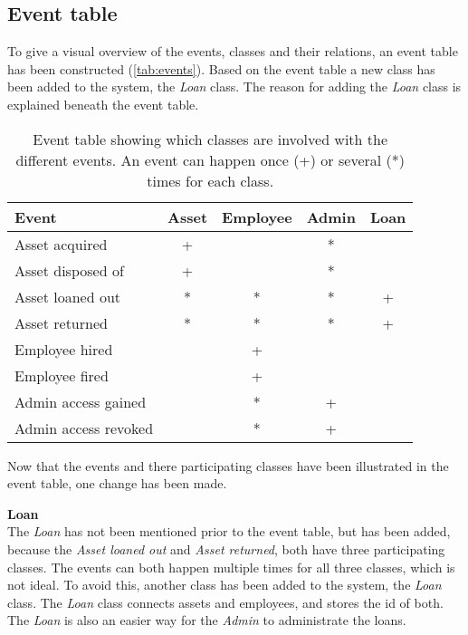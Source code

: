 \subsection{Event table}\label{ssc:eventtable}
To give a visual overview of the events, classes and their relations, an event table has been constructed (\autoref{tab:events}).
Based on the event table a new class has been added to the system, the \textit{Loan} class. The reason for adding the \textit{Loan} class is explained beneath the event table.

\begin{table}[H]
\centering
    \begin{tabular}{|l||c|c|c||c|}
        \hline
        \textbf{Event} & \textbf{Asset} & \textbf{Employee} & \textbf{Admin} & \textbf{Loan} \\
        \hline
        \hline
        Asset acquired & + & & * & \\
        \hline
        Asset disposed of & + & & * & \\
        \hline
        Asset loaned out & * & * & * & + \\
        \hline
        Asset returned & * & * & * & + \\
        \hline
        Employee hired & & + & & \\
        \hline
        Employee fired & & + & & \\
        \hline
        Admin access gained & & * & + & \\
        \hline
        Admin access revoked & & * & + & \\
        \hline
    \end{tabular}
\caption{Event table showing which classes are involved with the different events. An event can happen once (+) or several (*) times for each class.}\label{tab:events}
\end{table}

Now that the events and there participating classes have been illustrated in the event table, one change has been made.
\par
\textbf{Loan}\\
The \textit{Loan} has not been mentioned prior to the event table, but has been added, because the \textit{Asset loaned out} and \textit{Asset returned}, both have three participating classes. The events can both happen multiple times for all three classes, which is not ideal. To avoid this, another class has been added to the system, the \textit{Loan} class. The \textit{Loan} class connects assets and employees, and stores the id of both. The \textit{Loan} is also an easier way for the \textit{Admin} to administrate the loans.

